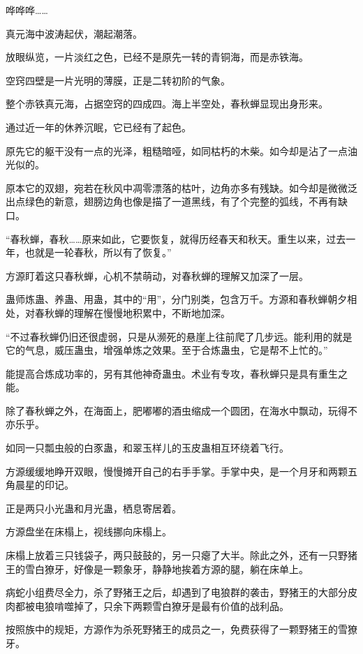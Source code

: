
\begin{this_body}

哗哗哗……

真元海中波涛起伏，潮起潮落。

放眼纵览，一片淡红之色，已经不是原先一转的青铜海，而是赤铁海。

空窍四壁是一片光明的薄膜，正是二转初阶的气象。

整个赤铁真元海，占据空窍的四成四。海上半空处，春秋蝉显现出身形来。

通过近一年的休养沉眠，它已经有了起色。

原先它的躯干没有一点的光泽，粗糙暗哑，如同枯朽的木柴。如今却是沾了一点油光似的。

原本它的双翅，宛若在秋风中凋零漂落的枯叶，边角亦多有残缺。如今却是微微泛出点绿色的新意，翅膀边角也像是描了一道黑线，有了个完整的弧线，不再有缺口。

“春秋蝉，春秋……原来如此，它要恢复，就得历经春天和秋天。重生以来，过去一年，也就是一轮春秋，所以有了恢复。”

方源盯着这只春秋蝉，心机不禁萌动，对春秋蝉的理解又加深了一层。

蛊师炼蛊、养蛊、用蛊，其中的“用”，分门别类，包含万千。方源和春秋蝉朝夕相处，对春秋蝉的理解在慢慢地积累中，不断地加深。

“不过春秋蝉仍旧还很虚弱，只是从濒死的悬崖上往前爬了几步远。能利用的就是它的气息，威压蛊虫，增强单炼之效果。至于合炼蛊虫，它是帮不上忙的。”

能提高合炼成功率的，另有其他神奇蛊虫。术业有专攻，春秋蝉只是具有重生之能。

除了春秋蝉之外，在海面上，肥嘟嘟的酒虫缩成一个圆团，在海水中飘动，玩得不亦乐乎。

如同一只瓢虫般的白豕蛊，和翠玉样儿的玉皮蛊相互环绕着飞行。

方源缓缓地睁开双眼，慢慢摊开自己的右手手掌。手掌中央，是一个月牙和两颗五角晨星的印记。

正是两只小光蛊和月光蛊，栖息寄居着。

方源盘坐在床榻上，视线挪向床榻上。

床榻上放着三只钱袋子，两只鼓鼓的，另一只瘪了大半。除此之外，还有一只野猪王的雪白獠牙，好像是一颗象牙，静静地挨着方源的腿，躺在床单上。

病蛇小组费尽全力，杀了野猪王之后，却遇到了电狼群的袭击，野猪王的大部分皮肉都被电狼啃噬掉了，只余下两颗雪白獠牙是最有价值的战利品。

按照族中的规矩，方源作为杀死野猪王的成员之一，免费获得了一颗野猪王的雪獠牙。


\end{this_body}
